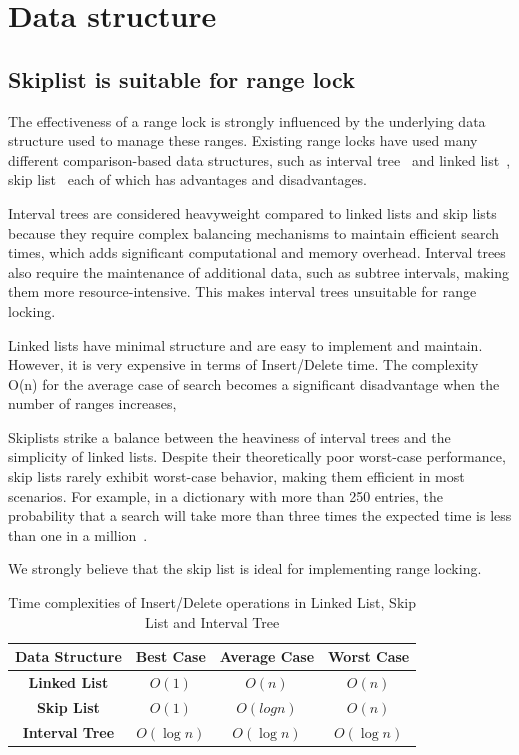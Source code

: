 \chapter{Data structure}\label{ch:data-structure}

\section{Skiplist is suitable for range lock}
The effectiveness of a range lock is strongly influenced by the underlying data structure used to manage these ranges. 
Existing range locks have used many different comparison-based data structures, such as interval tree~\parencite{linuxRangeLockImpl2013, kim2019pnova} and linked list~\parencite{song2013parallelizing}, skip list~\parencite{kogan2020scalable} each of which has advantages and disadvantages. 

Interval trees are considered heavyweight compared to linked lists and skip lists because they require complex balancing mechanisms to maintain efficient search times, which adds significant computational and memory overhead. 
Interval trees also require the maintenance of additional data, such as subtree intervals, making them more resource-intensive. This makes interval trees unsuitable for range locking. 

Linked lists have minimal structure and are easy to implement and maintain. However, it is very expensive in terms of Insert/Delete time. The complexity O(n) for the average case of search becomes a significant disadvantage when the number of ranges increases, 

Skiplists strike a balance between the heaviness of interval trees and the simplicity of linked lists. Despite their theoretically poor worst-case performance, skip lists rarely exhibit worst-case behavior, making them efficient in most scenarios.
For example, in a dictionary with more than 250 entries, the probability that a search will take more than three times the expected time is less than one in a million~\parencite{pugh1990skip2}. 

We strongly believe that the skip list is ideal for implementing range locking.

\begin{table}[h!]
    \centering
    \begin{tabular}{|c|c|c|c|}
        \hline
        \textbf{Data Structure} & \textbf{Best Case} & \textbf{Average Case} & \textbf{Worst Case} \\ \hline
        \textbf{Linked List} & $O(1)$ & $O(n)$ & $O(n)$ \\ \hline
        \textbf{Skip List} & $O(1)$ & $O(logn)$ & $O(n)$ \\ \hline
        \textbf{Interval Tree} & $O(\log n)$ & $O(\log n)$ & $O(\log n)$ \\ \hline
    \end{tabular}
    \caption{Time complexities of Insert/Delete operations in Linked List, Skip List and Interval Tree}
    \label{tab:insertdeletecomplexity}
\end{table}

